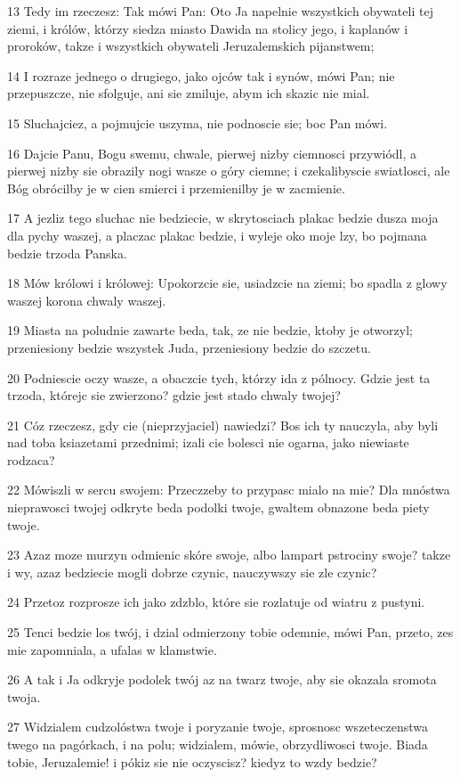 \par 13 Tedy im rzeczesz: Tak mówi Pan: Oto Ja napelnie wszystkich obywateli tej ziemi, i królów, którzy siedza miasto Dawida na stolicy jego, i kaplanów i proroków, takze i wszystkich obywateli Jeruzalemskich pijanstwem;
\par 14 I rozraze jednego o drugiego, jako ojców tak i synów, mówi Pan; nie przepuszcze, nie sfolguje, ani sie zmiluje, abym ich skazic nie mial.
\par 15 Sluchajciez, a pojmujcie uszyma, nie podnoscie sie; boc Pan mówi.
\par 16 Dajcie Panu, Bogu swemu, chwale, pierwej nizby ciemnosci przywiódl, a pierwej nizby sie obrazily nogi wasze o góry ciemne; i czekalibyscie swiatlosci, ale Bóg obrócilby je w cien smierci i przemienilby je w zacmienie.
\par 17 A jezliz tego sluchac nie bedziecie, w skrytosciach plakac bedzie dusza moja dla pychy waszej, a placzac plakac bedzie, i wyleje oko moje lzy, bo pojmana bedzie trzoda Panska.
\par 18 Mów królowi i królowej: Upokorzcie sie, usiadzcie na ziemi; bo spadla z glowy waszej korona chwaly waszej.
\par 19 Miasta na poludnie zawarte beda, tak, ze nie bedzie, ktoby je otworzyl; przeniesiony bedzie wszystek Juda, przeniesiony bedzie do szczetu.
\par 20 Podniescie oczy wasze, a obaczcie tych, którzy ida z pólnocy. Gdzie jest ta trzoda, którejc sie zwierzono? gdzie jest stado chwaly twojej?
\par 21 Cóz rzeczesz, gdy cie (nieprzyjaciel) nawiedzi? Bos ich ty nauczyla, aby byli nad toba ksiazetami przednimi; izali cie bolesci nie ogarna, jako niewiaste rodzaca?
\par 22 Mówiszli w sercu swojem: Przeczzeby to przypasc mialo na mie? Dla mnóstwa nieprawosci twojej odkryte beda podolki twoje, gwaltem obnazone beda piety twoje.
\par 23 Azaz moze murzyn odmienic skóre swoje, albo lampart pstrociny swoje? takze i wy, azaz bedziecie mogli dobrze czynic, nauczywszy sie zle czynic?
\par 24 Przetoz rozprosze ich jako zdzblo, które sie rozlatuje od wiatru z pustyni.
\par 25 Tenci bedzie los twój, i dzial odmierzony tobie odemnie, mówi Pan, przeto, zes mie zapomniala, a ufalas w klamstwie.
\par 26 A tak i Ja odkryje podolek twój az na twarz twoje, aby sie okazala sromota twoja.
\par 27 Widzialem cudzolóstwa twoje i poryzanie twoje, sprosnosc wszeteczenstwa twego na pagórkach, i na polu; widzialem, mówie, obrzydliwosci twoje. Biada tobie, Jeruzalemie! i pókiz sie nie oczyscisz? kiedyz to wzdy bedzie?

